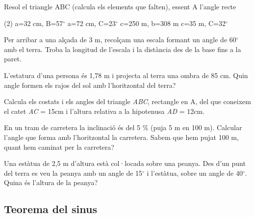\begin{mylist}
	
	\exer[1] Resol el triangle ABC (calcula els elements que falten), essent A l'angle recte
	\begin{tasks}(2)
		\task a=32 cm, B=57$^\circ$
		\task a=72 cm, C=23$^\circ$
		\task c=250 m, b=308 m
		\task c=35 m, C=32$^\circ$
	\end{tasks}
	\answers[cols=1]{[$\hat C=33$; $b=26,8$; $c=17,4$,  $\hat B=67$; $b=66,3$; $c=28,1$,  $\hat C=39$; $\hat B=51$; $a=396,7$,  $\hat B=58$; $b=56,01$; $a=66,05$]}
	
	\exer[1] Per arribar a una alçada de 3 m, recolçam una escala formant un angle de 60$^\circ$ amb el terra. Troba la longitud de l'escala i la distància des de la base fins a la paret.
	
	\exer[1] L'estatura d'una persona és 1,78 m i projecta al terra una ombra de 85 cm. Quin angle formen els rajos del sol amb l'horitzontal del terra?
	
	\exer[1]
	Calcula els costats i els angles del triangle \emph{ABC}, rectangle en
	A, del que coneixem el catet \emph{AC} = 15cm i l'altura relativa a
	la hipotenusa \emph{AD} = 12cm.
	
 
	\exer
	En un tram de carretera la inclinació és del 5 \% (puja 5 m en 100 m).
	Calcular l'angle que forma amb l'horitzontal la carretera. Sabem que
	hem pujat 100 m, quant hem caminat per la carretera?
	
	
	\exer \spicy[1] Una estàtua de 2,5 m d'altura està col·locada sobre una peanya. Des d'un punt del terra es veu la peanya amb un angle de 15$^\circ$ i l'estàtua, sobre un angle de 40$^\circ$. Quina és l'altura de la peanya?
	
\end{mylist}

\subsection{Teorema del sinus}


